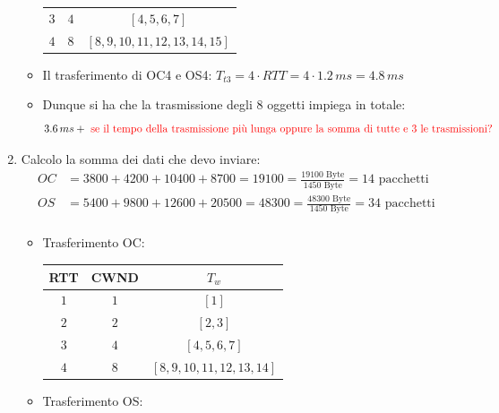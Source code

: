 \documentclass[10pt]{article}
\newcommand{\lightrule}{%
	\arrayrulecolor{black!30}%
	\midrule[\lightrulewidth]%
	\arrayrulecolor{black}}
\begin{document}
\begin{enumerate}
\begin{itemize}
\begin{center}
\begin{tabular}{@{} *{3}{c} @{}}
				\lightrule
 					$3$ & $4$ & $[4,5,6,7]$ \\ 				
 				\lightrule
 					$4$ & $8$ & $[8,9,10,11,12,13,14,15]$ \\
				\bottomrule
				\end{tabular}
			\end{center}
			\item Il trasferimento di OC4 e OS4: $T_{t3} = 4 \cdot RTT = 4 \cdot 1.2 \,ms = 4.8 \,ms$
			\item
			Dunque si ha che la trasmissione degli 8 oggetti impiega in totale:
			$$3.6 \,ms + \color{red} \textrm{ se il tempo della trasmissione più lunga oppure la somma di tutte e 3 le trasmissioni?}$$
		\end{itemize}
		\item
		Calcolo la somma dei dati che devo inviare:
		\begin{equation*}
			\begin{split}
				OC & = 3800 + 4200 + 10400 + 8700 = 19100 = \frac{19100 \textrm{ Byte}}{1450 \textrm{ Byte}} = 14 \textrm{ pacchetti}\\  
				OS & = 5400 + 9800 + 12600 + 20500 = 48300 = \frac{48300 \textrm{ Byte}}{1450 \textrm{ Byte}} = 34 \textrm{ pacchetti}\\  
			\end{split}
			\end{equation*}
			\begin{itemize}
				\item Trasferimento OC:
				\begin{center}
					\centering
 					\begin{tabular}{@{} *{3}{c} @{}}
 					\toprule
 						\textbf{RTT} & \textbf{CWND} & \textbf{$T_w$} \\
 					\midrule
 						$1$ & $1$ & $[1]$ \\ 
					\lightrule
 						$2$ & $2$ & $[2,3]$ \\  
 					\lightrule
 						$3$ & $4$ & $[4,5,6,7]$ \\ 
 					\lightrule
 						$4$ & $8$ & $[8,9,10,11,12,13,14]$ \\
					\bottomrule
					\end{tabular}
				\end{center}
				\item Trasferimento OS:
				\begin{center}
					\centering
 					\begin{tabular}{@{} *{3}{c} @{}}

\end{tabular}
\end{center}
\end{itemize}
\end{enumerate}
\end{document}

